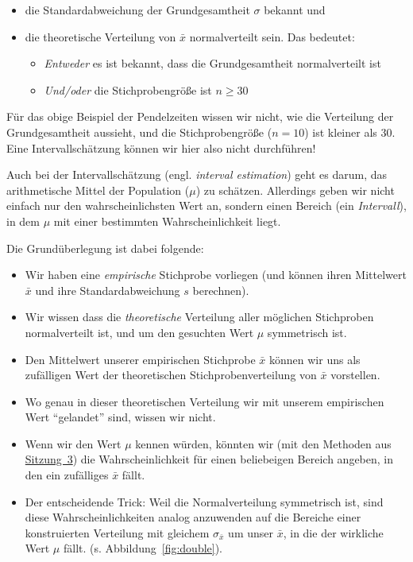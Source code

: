 \documentclass[
  11pt,
  ngerman,
  a4paper,
]{report}
\providecommand{\tightlist}{%
  \setlength{\itemsep}{0pt}\setlength{\parskip}{0pt}}
\begin{document}
\begin{itemize}
\tightlist
\item
  die Standardabweichung der Grundgesamtheit \(\sigma\) bekannt und
\item
  die theoretische Verteilung von \(\bar{x}\) normalverteilt sein. Das bedeutet:

  \begin{itemize}
  \tightlist
  \item
    \emph{Entweder} es ist bekannt, dass die Grundgesamtheit normalverteilt ist
  \item
    \emph{Und/oder} die Stichprobengröße ist \(n\geq30\)
  \end{itemize}
\end{itemize}

Für das obige Beispiel der Pendelzeiten wissen wir nicht, wie die Verteilung der Grundgesamtheit aussieht, und die Stichprobengröße (\(n=10\)) ist kleiner als 30. Eine Intervallschätzung können wir hier also nicht durchführen!

Auch bei der Intervallschätzung (engl. \emph{interval estimation}) geht es darum, das arithmetische Mittel der Population (\(\mu\)) zu schätzen. Allerdings geben wir nicht einfach nur den wahrscheinlichsten Wert an, sondern einen Bereich (ein \emph{Intervall}), in dem \(\mu\) mit einer bestimmten Wahrscheinlichkeit liegt.

Die Grundüberlegung ist dabei folgende:

\begin{itemize}
\tightlist
\item
  Wir haben eine \emph{empirische} Stichprobe vorliegen (und können ihren Mittelwert \(\bar{x}\) und ihre Standardabweichung \(s\) berechnen).
\item
  Wir wissen dass die \emph{theoretische} Verteilung aller möglichen Stichproben normalverteilt ist, und um den gesuchten Wert \(\mu\) symmetrisch ist.
\item
  Den Mittelwert unserer empirischen Stichprobe \(\bar{x}\) können wir uns als zufälligen Wert der theoretischen Stichprobenverteilung von \(\bar{x}\) vorstellen.
\item
  Wo genau in dieser theoretischen Verteilung wir mit unserem empirischen Wert \enquote{gelandet} sind, wissen wir nicht.
\item
  Wenn wir den Wert \(\mu\) kennen würden, könnten wir (mit den Methoden aus \protect\hyperlink{wahrscheinlichkeitsrechnung-mit-standardnormalverteilung}{Sitzung~3}) die Wahrscheinlichkeit für einen beliebeigen Bereich angeben, in den ein zufälliges \(\bar{x}\) fällt.
\item
  Der entscheidende Trick: Weil die Normalverteilung symmetrisch ist, sind diese Wahrscheinlichkeiten analog anzuwenden auf die Bereiche einer konstruierten Verteilung mit gleichem \(\sigma_{\bar{x}}\) um unser \(\bar{x}\), in die der wirkliche Wert \(\mu\) fällt. (s. Abbildung~\ref{fig:double}).
\end{itemize}
\end{document}
